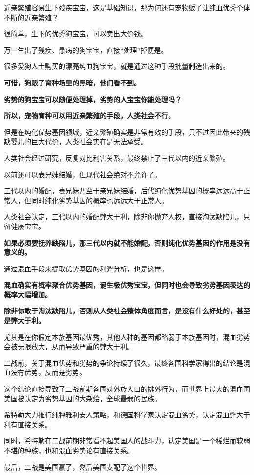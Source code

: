 \documentclass[UTF8, 11pt, oneside]{ctexart}
\newcommand{\zd}[1]{\textbf{\textcolor[RGB]{123,12,0}{#1}}} %
\begin{document}
近亲繁殖容易生下残疾宝宝，这是基础知识，那为何还有宠物贩子让纯血优秀个体不断的近亲繁殖？

很简单，生下的优秀狗宝宝，可以卖出大价钱。

万一生出了残疾、患病的狗宝宝，直接“处理”掉便是。

很多爱狗人士购买的漂亮纯血狗宝宝，就是通过这种手段批量制造出来的。

\zd{可惜，狗贩子育种场里的黑暗，他们看不到。}

\zd{劣势的狗宝宝可以随便处理掉，劣势的人宝宝你能处理吗？}

\zd{所以，宠物育种可以用近亲繁殖的手段，人类社会不行。}

但是在纯化优势基因领域，近亲繁殖确实是非常有效的手段，只不过因此带来的残缺婴儿的巨大代价，人类社会实在是无法承受。

人类社会经过研究，反复对比利害关系，最终禁止了三代以内的近亲繁殖。

以前还可以表兄妹结婚，但现代社会绝对不允许了。

三代以内的婚配，表兄妹乃至于亲兄妹结婚，后代纯化优势基因的概率远远高于正常人，但同时纯化劣势基因的概率也远远大于正常人。

人类社会认定，三代以内的婚配弊大于利，除非你抛弃人权，直接淘汰缺陷儿，只留健康宝宝。

\zd{如果必须要抚养缺陷儿，那三代以内就不能婚配，否则纯化优势基因的作用是没有意义的。}

通过混血手段来提取优势基因的利弊分析，也是这样。

\zd{混血确实有概率聚合优势基因，诞生极优秀宝宝，但同时也会导致劣势基因表达的概率大幅增加。}

\zd{除非你敢于淘汰缺陷儿，否则从人类社会整体角度而言，是没有什么好处的，甚至是弊大于利。}

尤其是在你假定本族基因最优秀，其他人种的基因都略弱于本族基因时，混血劣势会被无限放大，从而导致严重的弊大于利。

二战前，关于混血优势和劣势的争论持续了很久，最终各国科学家得出的结论是混血没有优势，反而是劣势。

这个结论直接导致了二战前期各国对外族人口的排外行为，而世界上最大的混血国美国被认定为劣势基因的大杂烩，全球最弱的民族。

希特勒大力推行纯种雅利安人策略，和德国科学家认定混血劣势，认定混血弊大于利有直接关系。

同时，希特勒在二战前期非常看不起美国人的战斗力，认定美国是一个稀烂而软弱不堪的种族，也和混血劣势论有直接关系。

最后，二战是美国赢了，然后美国支配了这个世界。
\end{document}
